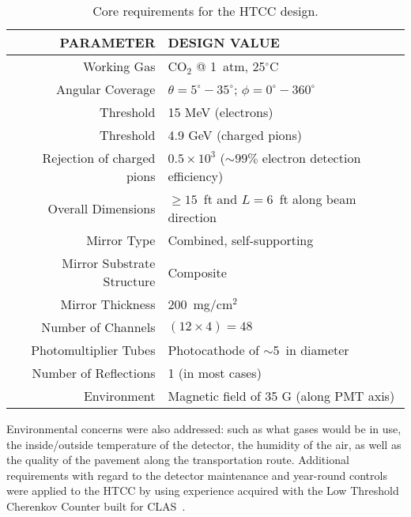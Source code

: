 \begin{table*}[t]
	\centering
	\caption{Core requirements for the HTCC design.}
	\begin{tabular}{ | r | l | }
		\hline
		PARAMETER & DESIGN VALUE \\ 
		\hline
		Working Gas & CO$_2$ @ 1~atm, 25$^\circ$C  \\ 
		\hline
		Angular Coverage & $\theta = 5^\circ - 35^\circ$; $\phi = 0^\circ - 360^\circ$ \\
		\hline
		Threshold & 15 MeV (electrons) \\
		\hline
		Threshold & 4.9 GeV (charged pions) \\
		\hline
		Rejection of charged pions & $0.5 \times 10^3$  ($\sim99\%$ electron detection efficiency)  \\
		\hline
		Overall Dimensions & $\geq 15$~ft and $L = 6$~ft along beam direction  \\
		\hline
		Mirror Type & Combined, self-supporting  \\
		\hline
		Mirror Substrate Structure & Composite  \\
		\hline
		Mirror Thickness & 200~mg/cm$^2$  \\
		\hline
		Number of Channels & $(12 \times 4) = 48$  \\
		\hline
		Photomultiplier Tubes & Photocathode of $\sim$5~in diameter  \\
		\hline
		Number of Reflections & 1 (in most cases)   \\
		\hline
		Environment & Magnetic field of 35 G (along PMT axis)   \\
		\hline
	\end{tabular}
	\label{tab:1}
\end{table*}

Environmental concerns were also addressed: such as what gases would be in use, the inside/outside
temperature of the detector, the humidity of the air, as well as the quality of the pavement along the
transportation route. Additional requirements with regard to the detector maintenance and year-round
controls were applied to the HTCC by using experience acquired with the Low Threshold Cherenkov Counter
built for CLAS~\cite{Adams:2001kk}.
